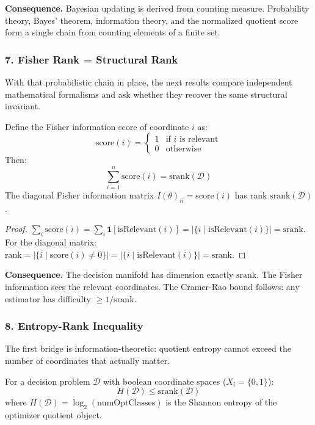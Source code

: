 \noindent\textbf{Consequence.} Bayesian updating is derived from counting measure. Probability theory, Bayes' theorem, information theory, and the normalized quotient score form a single chain from counting elements of a finite set.

\subsubsection{7. Fisher Rank = Structural Rank}

With that probabilistic chain in place, the next results compare independent mathematical formalisms and ask whether they recover the same structural invariant.

\begin{theorem}[Fisher Information = Structural Rank]\label{thm:fisher-rank-srank}
Define the Fisher information score of coordinate $i$ as:
\[
  \mathrm{score}(i) = \begin{cases} 1 & \text{if } i \text{ is relevant} \\ 0 & \text{otherwise} \end{cases}
\]
Then:
\[
  \sum_{i=1}^{n} \mathrm{score}(i) = \mathrm{srank}(\mathcal{D})
\]
The diagonal Fisher information matrix $I(\theta)_{ii} = \mathrm{score}(i)$ has rank $\mathrm{srank}(\mathcal{D})$.
\end{theorem}

\begin{proof}
$\sum_i \mathrm{score}(i) = \sum_i \mathbf{1}[\text{isRelevant}(i)] = |\{i \mid \text{isRelevant}(i)\}| = \mathrm{srank}$.
For the diagonal matrix: $\mathrm{rank} = |\{i \mid \mathrm{score}(i) \neq 0\}| = |\{i \mid \text{isRelevant}(i)\}| = \mathrm{srank}$.
\end{proof}

\noindent\textbf{Consequence.} The decision manifold has dimension exactly $\mathrm{srank}$. The Fisher information sees the relevant coordinates. The Cramer-Rao bound follows: any estimator has difficulty $\geq 1/\mathrm{srank}$.

\subsubsection{8. Entropy-Rank Inequality}

The first bridge is information-theoretic: quotient entropy cannot exceed the number of coordinates that actually matter.

\begin{theorem}\label{thm:entropy-rank}
For a decision problem $\mathcal{D}$ with boolean coordinate spaces ($X_i = \{0,1\}$):
\[
  H(\mathcal{D}) \leq \mathrm{srank}(\mathcal{D})
\]
where $H(\mathcal{D}) = \log_2(\mathrm{numOptClasses})$ is the Shannon entropy of the optimizer quotient object.
\end{theorem}

